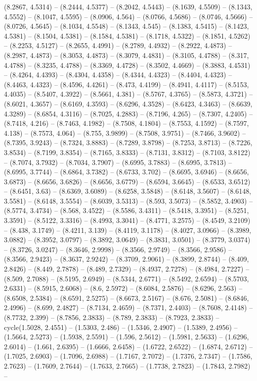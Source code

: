 (8.2867, 4.5314) -- (8.2444, 4.5377) -- (8.2042, 4.5443) -- (8.1639, 4.5509) -- (8.1343, 4.5552) -- (8.1047, 4.5595) -- (8.0906, 4.564) -- (8.0766, 4.5686) -- (8.0746, 4.5666) -- (8.0726, 4.5645) -- (8.1034, 4.5548) -- (8.1343, 4.545) -- (8.1383, 4.5415) -- (8.1423, 4.5381) -- (8.1504, 4.5381) -- (8.1584, 4.5381) -- (8.1718, 4.5322) -- (8.1851, 4.5262) -- (8.2253, 4.5127) -- (8.2655, 4.4991) -- (8.2789, 4.4932) -- (8.2922, 4.4873) -- (8.2987, 4.4873) -- (8.3053, 4.4873) -- (8.3079, 4.4831) -- (8.3105, 4.4788) -- (8.317, 4.4788) -- (8.3235, 4.4788) -- (8.3369, 4.4728) -- (8.3502, 4.4669) -- (8.3883, 4.4531) -- (8.4264, 4.4393) -- (8.4304, 4.4358) -- (8.4344, 4.4323) -- (8.4404, 4.4323) -- (8.4463, 4.4323) -- (8.4596, 4.4261) -- (8.473, 4.4199) -- (8.4941, 4.4117) -- (8.5153, 4.4035) -- (8.5407, 4.3922) -- (8.5661, 4.381) -- (8.5767, 4.3765) -- (8.5873, 4.3721) -- (8.6021, 4.3657) -- (8.6169, 4.3593) -- (8.6296, 4.3528) -- (8.6423, 4.3463) -- (8.6639, 4.3289) -- (8.6854, 4.3116) -- (8.7025, 4.2883) -- (8.7196, 4.265) -- (8.7307, 4.2405) -- (8.7418, 4.216) -- (8.7463, 4.1982) -- (8.7508, 4.1804) -- (8.7553, 4.1592) -- (8.7597, 4.138) -- (8.7573, 4.064) -- (8.755, 3.9899) -- (8.7508, 3.9751) -- (8.7466, 3.9602) -- (8.7395, 3.9243) -- (8.7324, 3.8883) -- (8.7289, 3.8798) -- (8.7253, 3.8713) -- (8.7226, 3.8534) -- (8.7199, 3.8354) -- (8.7165, 3.8333) -- (8.7131, 3.8312) -- (8.7103, 3.8122) -- (8.7074, 3.7932) -- (8.7034, 3.7907) -- (8.6995, 3.7883) -- (8.6995, 3.7813) -- (8.6995, 3.7744) -- (8.6864, 3.7382) -- (8.6733, 3.702) -- (8.6695, 3.6946) -- (8.6656, 3.6873) -- (8.6656, 3.6826) -- (8.6656, 3.6779) -- (8.6594, 3.6645) -- (8.6533, 3.6512) -- (8.6451, 3.63) -- (8.6369, 3.6089) -- (8.6258, 3.5848) -- (8.6148, 3.5607) -- (8.6148, 3.5581) -- (8.6148, 3.5554) -- (8.6039, 3.5313) -- (8.593, 3.5073) -- (8.5852, 3.4903) -- (8.5774, 3.4734) -- (8.568, 3.4522) -- (8.5586, 3.4311) -- (8.5418, 3.3951) -- (8.5251, 3.3591) -- (8.5122, 3.3316) -- (8.4993, 3.3041) -- (8.4771, 3.2575) -- (8.4549, 3.2109) -- (8.438, 3.1749) -- (8.4211, 3.139) -- (8.4119, 3.1178) -- (8.4027, 3.0966) -- (8.3989, 3.0882) -- (8.3952, 3.0797) -- (8.3892, 3.0649) -- (8.3831, 3.0501) -- (8.3779, 3.0374) -- (8.3726, 3.0247) -- (8.3646, 2.9998) -- (8.3566, 2.9749) -- (8.3566, 2.9586) -- (8.3566, 2.9423) -- (8.3637, 2.9242) -- (8.3709, 2.9061) -- (8.3899, 2.8744) -- (8.409, 2.8426) -- (8.449, 2.7878) -- (8.489, 2.7329) -- (8.4937, 2.7278) -- (8.4984, 2.7227) -- (8.509, 2.7088) -- (8.5195, 2.6949) -- (8.5344, 2.6771) -- (8.5492, 2.6594) -- (8.5703, 2.6331) -- (8.5915, 2.6068) -- (8.6, 2.5972) -- (8.6084, 2.5876) -- (8.6296, 2.563) -- (8.6508, 2.5384) -- (8.6591, 2.5275) -- (8.6673, 2.5167) -- (8.676, 2.5081) -- (8.6846, 2.4996) -- (8.699, 2.4827) -- (8.7134, 2.4659) -- (8.7371, 2.4403) -- (8.7608, 2.4148) -- (8.7732, 2.399) -- (8.7856, 2.3833) -- (8.789, 2.3833) -- (8.7923, 2.3833) -- cycle(1.5028, 2.4551) -- (1.5303, 2.486) -- (1.5346, 2.4907) -- (1.5389, 2.4956) -- (1.5664, 2.5273) -- (1.5938, 2.5591) -- (1.596, 2.5612) -- (1.5981, 2.5633) -- (1.6296, 2.6014) -- (1.661, 2.6395) -- (1.6666, 2.6458) -- (1.6722, 2.6522) -- (1.6874, 2.6712) -- (1.7025, 2.6903) -- (1.7096, 2.6988) -- (1.7167, 2.7072) -- (1.7376, 2.7347) -- (1.7586, 2.7623) -- (1.7609, 2.7644) -- (1.7633, 2.7665) -- (1.7738, 2.7823) -- (1.7843, 2.7982) -- 